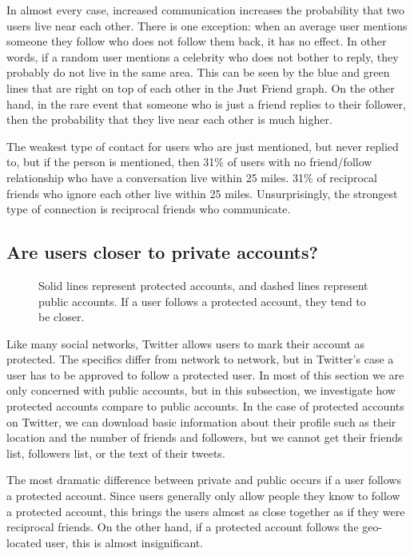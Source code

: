 \documentclass{sig-alternate}
\begin{document}
In almost every case, increased communication increases the probability that two users live near each other. There is one exception: when an average user mentions someone they follow who does not follow them back, it has no effect.
In other words, if a random user mentions a celebrity who does not bother to reply, they probably do not live in the same area. This can be seen by the blue and green lines that are right on top of each other in the Just Friend graph.
On the other hand, in the rare event that someone who is just a friend replies
to their follower, then the probability that they live near each other is much higher.

The weakest type of contact for users who are just mentioned, but never replied to, but if the person is mentioned, then 31\% of users with no friend/follow relationship who have a conversation live within 25 miles.
31\% of reciprocal friends who ignore each other live within 25 miles.
Unsurprisingly, the strongest type of connection is reciprocal friends who communicate.

\subsection{Are users closer to private accounts?}
\begin{figure}
\centering
{}
\caption{Solid lines represent protected accounts, and dashed lines represent public accounts. If a user follows a protected account, they tend to be closer.}
\label{fig:EdgeTypesProt}
\end{figure}

Like many social networks, Twitter allows users to mark their account as protected. The specifics differ from network to network, but in Twitter's case a user has to be approved to follow a protected user.
In most of this section we are only concerned with public accounts, but in this subsection, we investigate how protected accounts compare to public accounts.
In the case of protected accounts on Twitter, we can download basic information
about their profile such as their location and the number of friends and
followers, but we cannot get their friends list, followers list, or the text of their tweets.

The most dramatic difference between private and public occurs if a user follows a protected account.
Since users generally only allow people they know to follow a protected account, this brings the users almost as close together as if they were reciprocal friends. On the other hand, if a protected account follows the geo-located user, this is almost insignificant.
\end{document}
